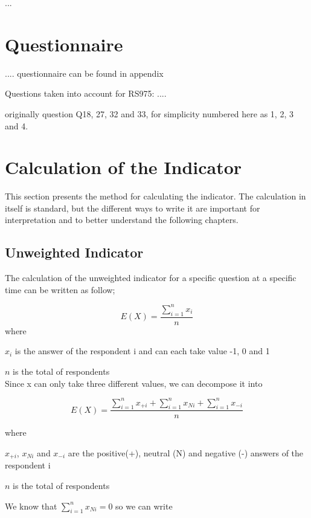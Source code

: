 \documentclass[12pt,a4paper,oneside]{book}
\begin{document}
...

\section{Questionnaire}
.... questionnaire can be found in appendix %


Questions taken into account for RS975:
....

originally question Q18, 27, 32 and 33, for simplicity numbered here as 1, 2, 3 and 4.


\newpage

\section{Calculation of the Indicator}

This section presents the method for calculating the indicator. 
The calculation in itself is standard, but the different ways to write it are important for interpretation and to better understand the following chapters.

\subsection{Unweighted Indicator}

The calculation of the unweighted indicator for a specific question at a specific time can be written as follow;

\begin{equation}
    E(X) = \frac{ \sum_{i=1}^n x_i}{n}
\end{equation} 
where 

$x_i$ is the answer of the respondent i and can each take value -1, 0 and 1 

$n$ is the total of respondents \\

Since x can only take three different values, we can decompose it into 

\begin{equation}
    E(X) = \frac{ \sum_{i=1}^n x_{+i} + \sum_{i=1}^n x_{Ni} + \sum_{i=1}^n x_{-i}}{n}
\end{equation} 

where 

$x_{+i}$, $x_{Ni}$ and $x_{-i}$ are the positive(+), neutral (N) and negative (-) answers of the respondent i

$n$ is the total of respondents

We know that $\sum_{i=1}^n x_{Ni} = 0$ so we can write
\end{document}
